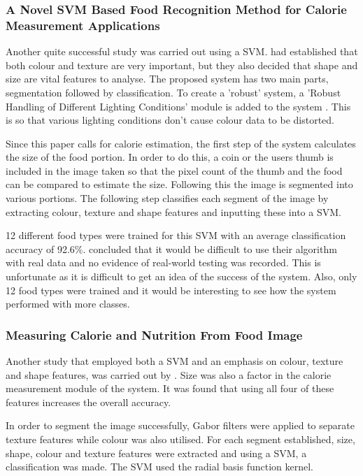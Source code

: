 \subsubsection*{A Novel SVM Based Food Recognition Method for Calorie Measurement Applications}
Another quite successful study was carried out using a SVM.
\parencite{novelSVM} had established that both colour and texture are very important, but they also decided that shape and size are vital features to analyse.
The proposed system has two main parts, segmentation followed by classification.
To create a 'robust' system, a 'Robust Handling of Different Lighting Conditions' module is added to the system \parencite{novelSVM}.
This is so that various lighting conditions don't cause colour data to be distorted. 

Since this paper calls for calorie estimation, the first step of the system calculates the size of the food portion. In order to do this, a coin or the users thumb is included in the image taken so that the pixel count of the thumb and the food can be compared to estimate the size. Following this the image is segmented into various portions. The following step classifies each segment of the image by extracting colour, texture and shape features and inputting these into a SVM.

12 different food types were trained for this SVM with an average classification accuracy of 92.6\%.
\parencite{novelSVM} concluded that it would be difficult to use their algorithm with real data and no evidence of real-world testing was recorded.
This is unfortunate as it is difficult to get an idea of the success of the system.
Also, only 12 food types were trained and it would be interesting to see how the system performed with more classes. 

\subsubsection*{Measuring Calorie and Nutrition From Food Image}
Another study that employed both a SVM and an emphasis on colour, texture and shape features, was carried out by \parencite{pouladzadeh2014measuring}.
Size was also a factor in the calorie measurement module of the system. It was found that using all four of these features increases the overall accuracy.

In order to segment the image successfully, Gabor filters were applied to separate texture features while colour was also utilised. For each segment established, size, shape, colour and texture features were extracted and using a SVM, a classification was made. The SVM used the radial basis function kernel.

